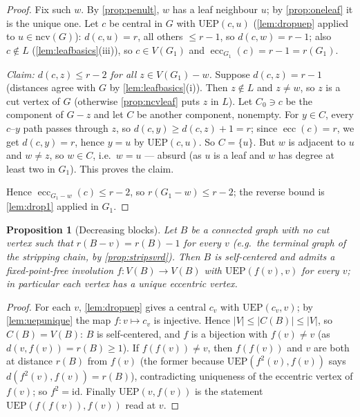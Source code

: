 \documentclass[11pt]{article}
\newtheorem{proposition}[theorem]{Proposition}
\theoremstyle{definition}
\newcommand{\ecc}{\operatorname{ecc}}
\newcommand{\NC}{\mathrm{ncv}}
\begin{document}
\begin{proof}
Fix such $w$.  By \cref{prop:penult}, $w$ has a leaf neighbour $u$;
by \cref{prop:oneleaf} it is the unique one.  Let $c$ be central
in $G$ with $\mathrm{UEP}(c,u)$ (\cref{lem:dropuep} applied to $u\in\NC(G)$):
$d(c,u)=r$, all others $\le r-1$, so $d(c,w)=r-1$; also $c\notin L$
(\cref{lem:leafbasics}(iii)), so $c\in V(G_1)$ and
$\ecc_{G_1}(c)=r-1=r(G_1)$.

\emph{Claim: $d(c,z)\le r-2$ for all $z\in V(G_1)-w$.}  Suppose
$d(c,z)=r-1$ (distances agree with $G$ by \cref{lem:leafbasics}(i)).
Then $z\notin L$ and $z\ne w$, so $z$ is a cut vertex of $G$ (otherwise
\cref{prop:ncvleaf} puts $z$ in $L$).  Let $C_0\ni c$ be the
component of $G-z$ and let $C$ be another component, nonempty.  For
$y\in C$, every $c$--$y$ path passes through $z$, so
$d(c,y)\ge d(c,z)+1=r$; since $\ecc(c)=r$, we get $d(c,y)=r$, hence $y=u$ by
$\mathrm{UEP}(c,u)$.  So $C=\{u\}$.  But $w$ is adjacent to $u$ and
$w\ne z$, so $w\in C$, i.e.\ $w=u$ --- absurd (as $u$ is a leaf and $w$ has
degree at least two in $G_1$).  This proves the claim.

Hence $\ecc_{G_1-w}(c)\le r-2$, so $r(G_1-w)\le r-2$; the reverse bound is
\cref{lem:drop1} applied in $G_1$.
\end{proof}

\begin{proposition}[Decreasing blocks]\label{prop:block}
Let $B$ be a connected graph with no cut vertex such that
$r(B-v)=r(B)-1$ for every $v$ (e.g.\ the terminal graph of the stripping
chain, by \cref{prop:stripsvrd}).  Then $B$ is self-centered and
admits a fixed-point-free involution $f:V(B)\to V(B)$ with
$\mathrm{UEP}(f(v),v)$ for every $v$; in particular each vertex has a unique
eccentric vertex.
\end{proposition}

\begin{proof}
For each $v$, \cref{lem:dropuep} gives a central $c_v$ with
$\mathrm{UEP}(c_v,v)$; by \cref{lem:uepunique} the map
$f:v\mapsto c_v$ is injective.  Hence $|V|\le|C(B)|\le|V|$, so
$C(B)=V(B)$: $B$ is self-centered, and $f$ is a bijection with $f(v)\ne v$
(as $d(v,f(v))=r(B)\ge1$).  If $f(f(v))\ne v$, then $f(f(v))$ and $v$ are
both at distance $r(B)$ from $f(v)$ (the former because
$\mathrm{UEP}(f^2(v),f(v))$ says $d(f^2(v),f(v))=r(B)$), contradicting
uniqueness of the eccentric vertex of $f(v)$; so $f^2=\mathrm{id}$.  Finally
$\mathrm{UEP}(v,f(v))$ is the statement
$\mathrm{UEP}(f(f(v)),f(v))$ read at $v$.
\end{proof}
\end{document}
